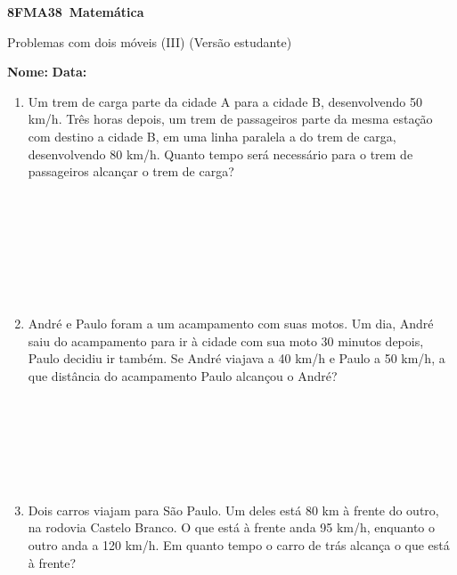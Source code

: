 \documentclass[a4paper,14pt]{article}
\begin{document}
	
	\noindent\textbf{8FMA38~Matemática} 
	
	\begin{center}Problemas com dois móveis (III) (Versão estudante)
	\end{center}
	
	\noindent\textbf{Nome:} \underline{\hspace{10cm}}
	\noindent\textbf{Data:} \underline{\hspace{4cm}}
	
	
    \begin{multicols}{2}
    	\begin{enumerate}
    		\item Um trem de carga parte da cidade A para a cidade B, desenvolvendo 50 km/h. Três horas depois, um trem de passageiros parte da mesma estação com destino a cidade B, em uma linha paralela a do trem de carga, desenvolvendo 80 km/h. Quanto tempo será necessário para o trem de passageiros alcançar o trem de carga? \\\\\\\\\\\\\\\\
    		\item André e Paulo foram a um acampamento com suas motos. Um dia, André saiu do acampamento para ir à cidade com sua moto 30 minutos depois, Paulo decidiu ir também. Se André viajava a 40 km/h e Paulo a 50 km/h, a que distância do acampamento Paulo alcançou o André? \\\\\\\\\\\\\\
    		\item Dois carros viajam para São Paulo. Um deles está 80 km à frente do outro, na rodovia Castelo Branco. O que está à frente anda 95 km/h, enquanto o outro anda a 120 km/h. Em quanto tempo o carro de trás alcança o que está à frente? \\\\\\\\\\\\\\

\end{enumerate}
\end{multicols}
\end{document}
